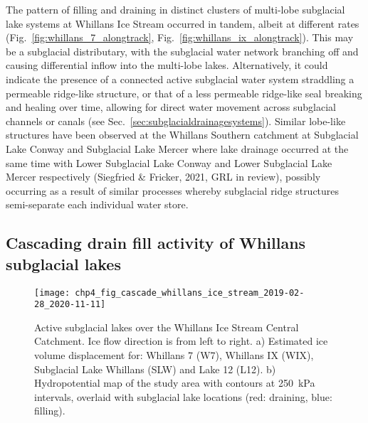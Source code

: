 The pattern of filling and draining in distinct clusters of multi-lobe subglacial lake systems at Whillans Ice Stream occurred in tandem, albeit at different rates (Fig.~\ref{fig:whillans_7_alongtrack}, Fig.~\ref{fig:whillans_ix_alongtrack}).
This may be a subglacial distributary, with the subglacial water network branching off and causing differential inflow into the multi-lobe lakes.
Alternatively, it could indicate the presence of a connected active subglacial water system straddling a permeable ridge-like structure, or that of a less permeable ridge-like seal breaking and healing over time, allowing for direct water movement across subglacial channels or canals (see Sec.~\ref{sec:subglacialdrainagesystems}).
Similar lobe-like structures have been observed at the Whillans Southern catchment at Subglacial Lake Conway and Subglacial Lake Mercer where lake drainage occurred at the same time with Lower Subglacial Lake Conway and Lower Subglacial Lake Mercer respectively (Siegfried \& Fricker, 2021, GRL in review), possibly occurring as a result of similar processes whereby subglacial ridge structures semi-separate each individual water store. %




\subsection{Cascading drain fill activity of Whillans subglacial lakes} \label{sec:cascade}

\begin{figure}[htbp]
  \texttt{[image: chp4\_fig\_cascade\_whillans\_ice\_stream\_2019-02-28\_2020-11-11]}
  \caption[Ice Volume displacement over Whillans Ice Stream Central Catchment lakes]{
    Active subglacial lakes over the Whillans Ice Stream Central Catchment.
    Ice flow direction is from left to right.
    a) Estimated ice volume displacement for: Whillans 7 (W7), Whillans IX (WIX), Subglacial Lake Whillans (SLW) and Lake 12 (L12).
    b) Hydropotential map of the study area with contours at \SI{250}{\kilo\pascal} intervals, overlaid with subglacial lake locations (red: draining, blue: filling).
  }
  \label{fig:cascade}
\end{figure}

